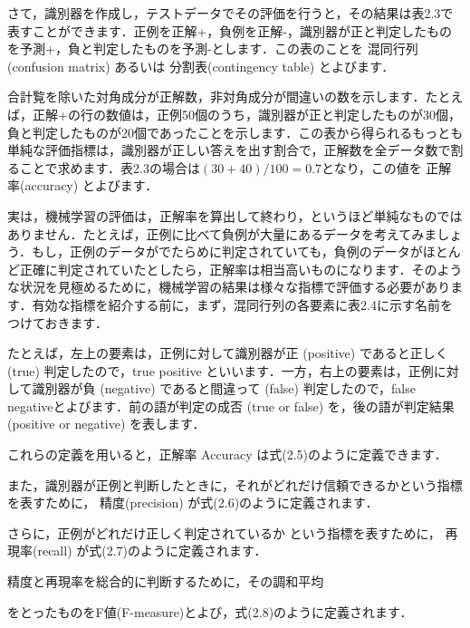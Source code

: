 さて，識別器を作成し，テストデータでその評価を行うと，その結果は表2.3で表すことができます．正例を正解+，負例を正解-，識別器が正と判定したものを予測+，負と判定したものを予測-とします．この表のことを
混同行列(confusion matrix)
あるいは
分割表(contingency table)
とよびます．



合計覧を除いた対角成分が正解数，非対角成分が間違いの数を示します．たとえば，正解+の行の数値は，正例50個のうち，識別器が正と判定したものが30個，負と判定したものが20個であったことを示します．この表から得られるもっとも単純な評価指標は，識別器が正しい答えを出す割合で，正解数を全データ数で割ることで求めます．表2.3の場合は$(30+40)/100=0.7$となり，この値を
正解率(accuracy)
とよびます．


実は，機械学習の評価は，正解率を算出して終わり，というほど単純なものではありません．たとえば，正例に比べて負例が大量にあるデータを考えてみましょう．もし，正例のデータがでたらめに判定されていても，負例のデータがほとんど正確に判定されていたとしたら，正解率は相当高いものになります．そのような状況を見極めるために，機械学習の結果は様々な指標で評価する必要があります．有効な指標を紹介する前に，まず，混同行列の各要素に表2.4に示す名前をつけておきます．


たとえば，左上の要素は，正例に対して識別器が正 (positive) であると正しく (true) 判定したので，true positive といいます．一方，右上の要素は，正例に対して識別器が負 (negative) であると間違って (false) 判定したので，false negativeとよびます．前の語が判定の成否 (true or false) を，後の語が判定結果 (positive or negative) を表します．

これらの定義を用いると，正解率 Accuracy は式(2.5)のように定義できます．


また，識別器が正例と判断したときに，それがどれだけ信頼できるかという指標を表すために，
精度(precision)
が式(2.6)のように定義されます．

さらに，正例がどれだけ正しく判定されているか
という指標を表すために，
再現率(recall)
が式(2.7)のように定義されます．


精度と再現率を総合的に判断するために，その調和平均

をとったものをF値(F-measure)とよび，式(2.8)のように定義されます．


